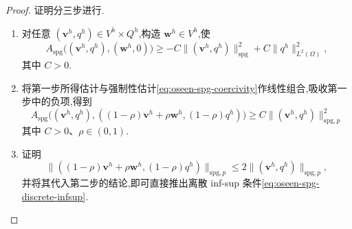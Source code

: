 \begin{proof}
证明分三步进行.
\begin{enumerate}[label=\roman*)]
  \item 对任意 $(\bm{v}^h,q^h)\in V^h\times Q^h$,构造 $\bm{w}^h\in V^h$,使
  \[
    A_{\mathrm{spg}}\bigl((\bm{v}^h,q^h),(\bm{w}^h,0)\bigr)
      \ge -C\|(\bm{v}^h,q^h)\|_{\mathrm{spg}}^2
          +C\|q^h\|_{L^2(\Omega)}^2,
  \]
  其中 $C>0$.
  \item 将第一步所得估计与强制性估计\cref{eq:oseen-spg-coercivity}作线性组合,吸收第一步中的负项,得到
  \[
    A_{\mathrm{spg}}\bigl((\bm{v}^h,q^h),
       ((1-\rho)\bm{v}^h+\rho\bm{w}^h,(1-\rho)q^h)\bigr)
      \ge C\|(\bm{v}^h,q^h)\|_{\mathrm{spg},p}^2
  \]
  其中 $C>0$、$\rho\in(0,1)$.
  \item 证明
  \[
    \|((1-\rho)\bm{v}^h+\rho\bm{w}^h,(1-\rho)q^h)\|_{\mathrm{spg},p}
      \le 2\|(\bm{v}^h,q^h)\|_{\mathrm{spg},p},
  \]
  并将其代入第二步的结论,即可直接推出离散 inf-sup 条件\cref{eq:oseen-spg-discrete-infsup}.
\end{enumerate}


\end{proof}
